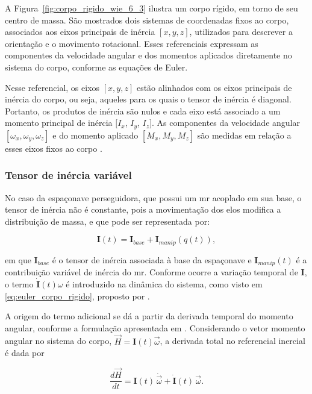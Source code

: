 A Figura~\ref{fig:corpo_rigido_wie_6_3} ilustra um corpo rígido, em torno de seu centro de massa.
São mostrados dois sistemas de coordenadas fixos ao corpo, associados aos eixos principais de inércia ${[x, y, z]}$, utilizados para descrever a orientação e o movimento rotacional.
Esses referenciais expressam as componentes da velocidade angular e dos momentos aplicados diretamente no sistema do corpo, conforme as equações de Euler.

Nesse referencial, os eixos ${[x, y, z]}$ estão alinhados com os eixos principais de inércia do corpo, ou seja, aqueles para os quais o tensor de inércia é diagonal.
Portanto, os produtos de inércia são nulos e cada eixo está associado a um momento principal de inércia $[I_x$, $I_y$, $I_z$].
As componentes da velocidade angular $[\omega_x, \omega_y, \omega_z]$ e do momento aplicado $[M_x, M_y, M_z]$ são medidas em relação a esses eixos fixos ao corpo \cite{wie2008space}.

\subsubsection{Tensor de inércia variável}

No caso da espaçonave perseguidora, que possui um \gls{mr} acoplado em sua base, o tensor de inércia não é constante, pois a movimentação dos elos modifica a distribuição de massa, e que pode ser representada por:

\begin{equation}
\mathbf{I}(t) = \mathbf{I}_{base} + \mathbf{I}_{manip}(q(t)),
\label{eq:inercia_total}
\end{equation}

em que $\mathbf{I}_{base}$ é o tensor de inércia associada à base da espaçonave e $\mathbf{I}_{manip}(t)$ é a contribuição variável de inércia do \gls{mr}.
Conforme ocorre a variação temporal de $\mathbf{I}$, o termo $\dot{\mathbf{I}}(t)\omega$ é introduzido na dinâmica do sistema, como visto em \eqref{eq:euler_corpo_rigido}, proposto por \cite{wie2008space}.

A origem do termo adicional se dá a partir da derivada temporal do momento angular, conforme a formulação apresentada em \cite{wie2008space}.
Considerando o vetor momento angular no sistema do corpo,
$\vec{H} = \mathbf{I}(t)\vec{\omega}$, 
a derivada total no referencial inercial é dada por

\begin{equation}
\frac{d\vec{H}}{dt} = \mathbf{I}(t)\,\dot{\vec{\omega}} + \dot{\mathbf{I}}(t)\,\vec{\omega}.
\label{eq:derivada_momento_angular}
\end{equation}


